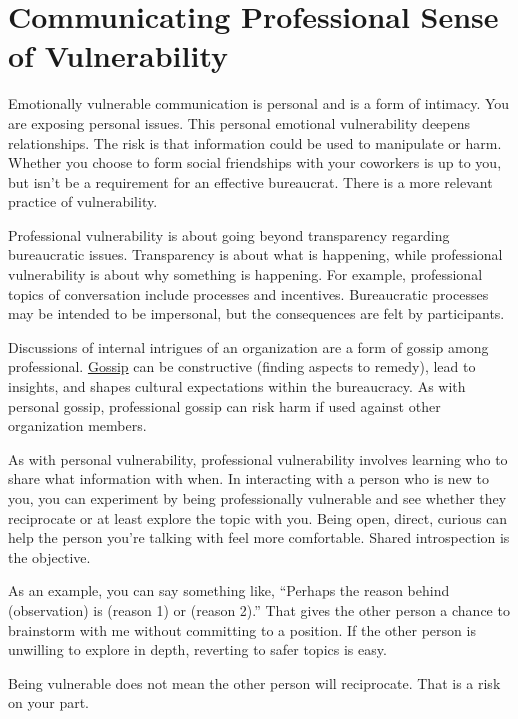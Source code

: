 \section{Communicating Professional Sense of Vulnerability\label{sec:professional-vulnerability}}

Emotionally vulnerable communication is personal and is a form of intimacy. You are exposing personal issues. This personal emotional vulnerability deepens relationships. The risk is that information could be used to manipulate or harm. Whether you choose to form social friendships with your coworkers is up to you, but isn't be a requirement for an effective bureaucrat. There is a more relevant practice of vulnerability.

Professional vulnerability is about going beyond transparency regarding bureaucratic issues. Transparency is about what is happening, while professional vulnerability is about why something is happening. For example, professional topics of conversation include processes and incentives. Bureaucratic processes may be intended to be impersonal, but the consequences are felt by participants.


Discussions of internal intrigues of an organization are a form of gossip among professional. \href{https://en.wikipedia.org/wiki/Gossip}{Gossip} 
\iftoggle{WPinmargin}{\marginpar{[Wikipedia] Gossip}}{}
can be constructive (finding aspects to remedy),  lead to insights, and shapes cultural expectations within the bureaucracy. As with personal gossip, professional gossip can risk harm if used against other organization members. 

As with personal vulnerability, professional vulnerability involves learning who to share what information with when. In interacting with a person who is new to you, you can experiment by being professionally vulnerable and see whether they reciprocate or at least explore the topic with you. Being open, direct, curious can help the person you're talking with feel more comfortable. Shared introspection is the objective. 

As an example, you can say something like, ``Perhaps the reason behind (observation) is (reason 1) or (reason 2).'' That gives the other person a chance to brainstorm with me without committing to a position. If the other person is unwilling to explore in depth, reverting to safer topics is easy.

Being vulnerable does not mean the other person will reciprocate. That is a risk on your part. 